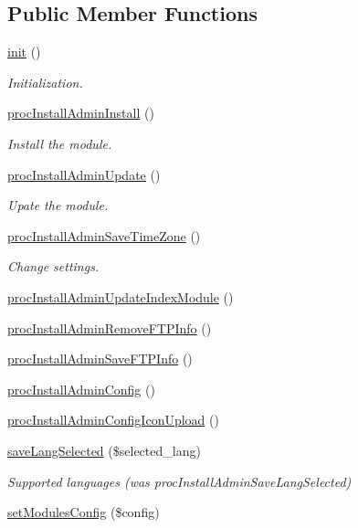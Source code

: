 \subsection*{Public Member Functions}
\begin{DoxyCompactItemize}
\item 
\hyperlink{classinstallAdminController_a3eda4638a74c9a92eba2803c1beff6a3}{init} ()
\begin{DoxyCompactList}\small\item\em Initialization. \end{DoxyCompactList}\item 
\hyperlink{classinstallAdminController_a9aa974c8cc406f536e712000ae7c431b}{proc\-Install\-Admin\-Install} ()
\begin{DoxyCompactList}\small\item\em Install the module. \end{DoxyCompactList}\item 
\hyperlink{classinstallAdminController_a90423de1ab7aee1f0eb7a48af5d05224}{proc\-Install\-Admin\-Update} ()
\begin{DoxyCompactList}\small\item\em Upate the module. \end{DoxyCompactList}\item 
\hyperlink{classinstallAdminController_a0b7b97dd361bda6202fb1c8895852960}{proc\-Install\-Admin\-Save\-Time\-Zone} ()
\begin{DoxyCompactList}\small\item\em Change settings. \end{DoxyCompactList}\item 
\hyperlink{classinstallAdminController_ae72e98f16d94d17f94d7cdce7060faed}{proc\-Install\-Admin\-Update\-Index\-Module} ()
\item 
\hyperlink{classinstallAdminController_a76919653ad07627e7f0aa4b01cc2b9fe}{proc\-Install\-Admin\-Remove\-F\-T\-P\-Info} ()
\item 
\hyperlink{classinstallAdminController_a3ea9e37eed169cfa5448359db173f263}{proc\-Install\-Admin\-Save\-F\-T\-P\-Info} ()
\item 
\hyperlink{classinstallAdminController_a57d9a607291587b656246beca9fd51fe}{proc\-Install\-Admin\-Config} ()
\item 
\hyperlink{classinstallAdminController_a43a0d4db547322f22884c7dffbda6b87}{proc\-Install\-Admin\-Config\-Icon\-Upload} ()
\item 
\hyperlink{classinstallAdminController_ae7c646732649d1b526f0740d988a4164}{save\-Lang\-Selected} (\$selected\-\_\-lang)
\begin{DoxyCompactList}\small\item\em Supported languages (was proc\-Install\-Admin\-Save\-Lang\-Selected) \end{DoxyCompactList}\item 
\hyperlink{classinstallAdminController_ab19d26e4473d9b40a494d5b1f1dbb996}{set\-Modules\-Config} (\$config)
\end{DoxyCompactItemize}

